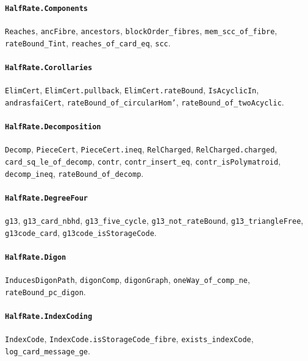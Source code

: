 \paragraph{\texttt{HalfRate.Components}}
{\small\raggedright \texttt{Reaches}, \texttt{ancFibre}, \texttt{ancestors}, \texttt{blockOrder\_fibres}, \texttt{mem\_scc\_of\_fibre}, \texttt{rateBound\_Tint}, \texttt{reaches\_of\_card\_eq}, \texttt{scc}.\par}

\paragraph{\texttt{HalfRate.Corollaries}}
{\small\raggedright \texttt{ElimCert}, \texttt{ElimCert.pullback}, \texttt{ElimCert.rateBound}, \texttt{IsAcyclicIn}, \texttt{andrasfaiCert}, \texttt{rateBound\_of\_circularHom'}, \texttt{rateBound\_of\_twoAcyclic}.\par}

\paragraph{\texttt{HalfRate.Decomposition}}
{\small\raggedright \texttt{Decomp}, \texttt{PieceCert}, \texttt{PieceCert.ineq}, \texttt{RelCharged}, \texttt{RelCharged.charged}, \texttt{card\_sq\_le\_of\_decomp}, \texttt{contr}, \texttt{contr\_insert\_eq}, \texttt{contr\_isPolymatroid}, \texttt{decomp\_ineq}, \texttt{rateBound\_of\_decomp}.\par}

\paragraph{\texttt{HalfRate.DegreeFour}}
{\small\raggedright \texttt{g13}, \texttt{g13\_card\_nbhd}, \texttt{g13\_five\_cycle}, \texttt{g13\_not\_rateBound}, \texttt{g13\_triangleFree}, \texttt{g13code\_card}, \texttt{g13code\_isStorageCode}.\par}

\paragraph{\texttt{HalfRate.Digon}}
{\small\raggedright \texttt{InducesDigonPath}, \texttt{digonComp}, \texttt{digonGraph}, \texttt{oneWay\_of\_comp\_ne}, \texttt{rateBound\_pc\_digon}.\par}

\paragraph{\texttt{HalfRate.IndexCoding}}
{\small\raggedright \texttt{IndexCode}, \texttt{IndexCode.isStorageCode\_fibre}, \texttt{exists\_indexCode}, \texttt{log\_card\_message\_ge}.\par}


